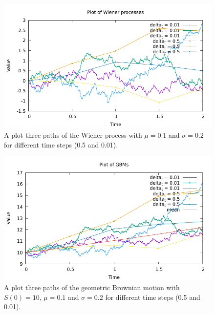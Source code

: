 \documentclass{scrartcl}
\begin{document}
	\begin{figure}[h!]
		\centering
		\includegraphics[width=\textwidth]{wiener}
		\caption{A plot three paths of the Wiener process with $\mu = 0.1$ and $\sigma = 0.2$ for different time steps (0.5 and 0.01).}
		\label{fig_wiener}
	\end{figure}
	\begin{figure}[h!]
		\centering
		\includegraphics[width=\textwidth]{gbm}
		\caption{A plot three paths of the geometric Brownian motion with $S(0) = 10$, $\mu = 0.1$ and $\sigma = 0.2$ for different time steps (0.5 and 0.01).}
		\label{fig_gbm}
	\end{figure}
	
\end{document}

